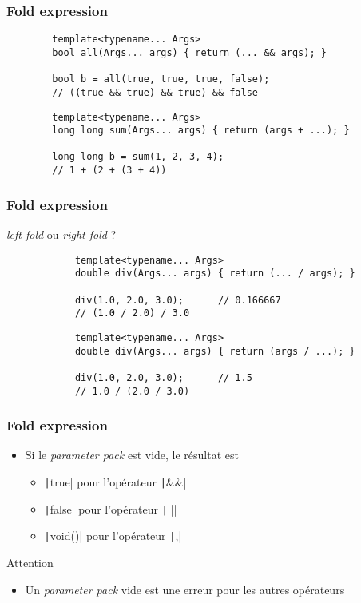\documentclass[C++.tex]{subfiles}
\begin{document}
\begin{frame}[fragile]
	\frametitle{Fold expression}
	\begin{verbatim}
		template<typename... Args>
		bool all(Args... args) { return (... && args); }

		bool b = all(true, true, true, false);
		// ((true && true) && true) && false
	\end{verbatim}

	\begin{verbatim}
		template<typename... Args>
		long long sum(Args... args) { return (args + ...); }

		long long b = sum(1, 2, 3, 4);
		// 1 + (2 + (3 + 4))
	\end{verbatim}
\end{frame}

\begin{frame}[fragile]
	\frametitle{Fold expression}
	\begin{alertblock}{\textit{left fold} ou \textit{right fold} ?}
		\begin{verbatim}
			template<typename... Args>
			double div(Args... args) { return (... / args); }

			div(1.0, 2.0, 3.0);      // 0.166667
			// (1.0 / 2.0) / 3.0
		\end{verbatim}

		\begin{verbatim}
			template<typename... Args>
			double div(Args... args) { return (args / ...); }

			div(1.0, 2.0, 3.0);      // 1.5
			// 1.0 / (2.0 / 3.0)
		\end{verbatim}
	\end{alertblock}
\end{frame}

\begin{frame}[fragile]
	\frametitle{Fold expression}
	\begin{itemize}
		\item Si le \textit{parameter pack} est vide, le résultat est
		\begin{itemize}
			\item \texttt|true| pour l'opérateur \texttt|&&|
			\item \texttt|false| pour l'opérateur \texttt||||
			\item \texttt|void()| pour l'opérateur \texttt|,|
		\end{itemize}
	\end{itemize}

	\begin{alertblock}{Attention}
		\begin{itemize}
			\item Un \textit{parameter pack} vide est une erreur pour les autres opérateurs
		\end{itemize}
	\end{alertblock}
\end{frame}
\end{document}
